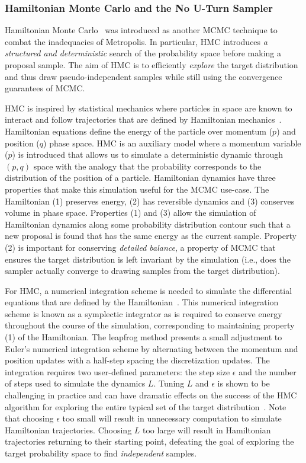 \subsubsection{Hamiltonian Monte Carlo and the No U-Turn Sampler}\label{sec:hmc_nuts}

Hamiltonian Monte Carlo~\citep{neal2011mcmc} was introduced as another MCMC technique to combat the inadequacies of Metropolis. In particular, HMC introduces \textit{a structured and deterministic} search of the probability space before making a proposal sample. The aim of HMC is to efficiently \textit{explore} the target distribution and thus draw pseudo-independent samples while still using the convergence guarantees of MCMC.

HMC is inspired by statistical mechanics where particles in space are known to interact and follow trajectories that are defined by Hamiltonian mechanics~\citep{neal2011mcmc}. Hamiltonian equations define the energy of the particle over momentum ($p$) and position ($q$) phase space. HMC is an auxiliary model where a momentum variable ($p$) is introduced that allows us to simulate a deterministic dynamic through $(p,q)$ space with the analogy that the probability corresponds to the distribution of the position of a particle. Hamiltonian dynamics have three properties that make this simulation useful for the MCMC use-case. The Hamiltonian (1) preserves energy, (2) has reversible dynamics and (3) conserves volume in phase space. Properties (1) and (3) allow the simulation of Hamiltonian dynamics along some probability distribution contour such that a new proposal is found that has the same energy as the current sample. Property (2) is important for conserving \textit{detailed balance}, a property of MCMC that ensures the target distribution is left invariant by the simulation (i.e., does the sampler actually converge to drawing samples from the target distribution).

For HMC, a numerical integration scheme is needed to simulate the differential equations that are defined by the Hamiltonian~\citep{neal2011mcmc}. This numerical integration scheme is known as a symplectic integrator as is required to conserve energy throughout the course of the simulation, corresponding to maintaining property (1) of the Hamiltonian. The leapfrog method presents a small adjustment to Euler's numerical integration scheme by alternating between the momentum and position updates with a half-step spacing the discretization updates. The integration requires two user-defined parameters: the step size $\epsilon$ and the number of steps used to simulate the dynamics $L$. Tuning $L$ and $\epsilon$ is shown to be challenging in practice and can have dramatic effects on the success of the HMC algorithm for exploring the entire typical set of the target distribution~\citep{hoffman2014no}. Note that choosing $\epsilon$ too small will result in unnecessary computation to simulate Hamiltonian trajectories. Choosing $L$ too large will result in Hamiltonian trajectories returning to their starting point, defeating the goal of exploring the target probability space to find \textit{independent} samples.

